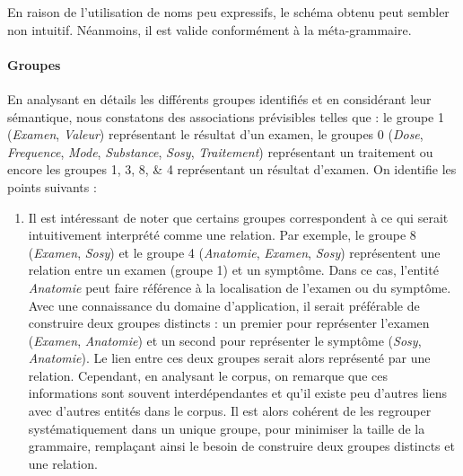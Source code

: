 En raison de l'utilisation de noms peu expressifs, le schéma obtenu peut sembler non intuitif.
Néanmoins, il est valide conformément à la méta-grammaire.

\paragraph{Groupes}
En analysant en détails les différents groupes identifiés et en considérant leur sémantique, nous constatons des associations prévisibles telles que : le groupe 1 (\emph{Examen}, \emph{Valeur}) représentant le résultat d'un examen, le groupes 0 (\emph{Dose}, \emph{Frequence}, \emph{Mode}, \emph{Substance}, \emph{Sosy}, \emph{Traitement}) représentant un traitement ou encore les groupes \numlist{1;3;8;4} représentant un résultat d'examen.
On identifie les points suivants :
\begin{enumerate}
    \item Il est intéressant de noter que certains groupes correspondent à ce qui serait intuitivement interprété comme une relation.
    Par exemple, le groupe 8 (\emph{Examen}, \emph{Sosy}) et le groupe 4 (\emph{Anatomie}, \emph{Examen}, \emph{Sosy}) représentent une relation entre un examen (groupe 1) et un symptôme.
    Dans ce cas, l'entité \emph{Anatomie} peut faire référence à la localisation de l'examen ou du symptôme.
    Avec une connaissance du domaine d'application, il serait préférable de construire deux groupes distincts : un premier pour représenter l'examen (\emph{Examen}, \emph{Anatomie}) et un second pour représenter le symptôme (\emph{Sosy}, \emph{Anatomie}).
    Le lien entre ces deux groupes serait alors représenté par une relation.
    Cependant, en analysant le corpus, on remarque que ces informations sont souvent interdépendantes et qu'il existe peu d'autres liens avec d'autres entités dans le corpus.
    Il est alors cohérent de les regrouper systématiquement dans un unique groupe, pour minimiser la taille de la grammaire, remplaçant ainsi le besoin de construire deux groupes distincts et une relation.


\end{enumerate}
